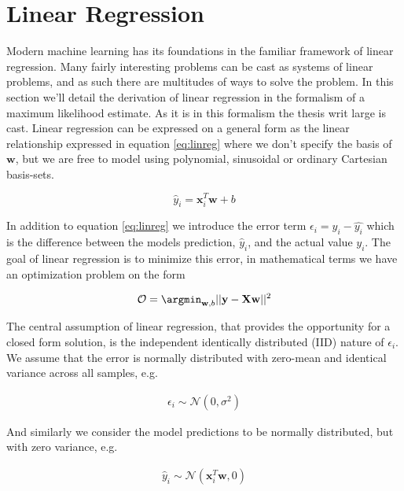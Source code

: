 
\section{Linear Regression}\label{sec:LinReg}

Modern machine learning has its foundations in the familiar framework of linear regression. Many fairly interesting problems can be cast as systems of linear problems, and as such there are multitudes of ways to solve the problem. In this section we'll detail the derivation of linear regression in the formalism of a maximum likelihood estimate. As it is in this formalism the thesis writ large is cast. Linear regression can be expressed on a general form as the linear relationship expressed in equation \ref{eq:linreg} where we don't specify the basis of $\mathbf{w}$, but we are free to model using polynomial, sinusoidal or ordinary Cartesian basis-sets.

\begin{equation}\label{eq:linreg}
\hat{y}_i = \mathbf{x}_i^T\mathbf{w} + b
\end{equation}

\noindent In addition to equation \ref{eq:linreg} we introduce the error term $\epsilon_i= y_i - \hat{y_i}$ which is the difference between the models prediction, $\hat{y}_i$, and the actual value $y_i$. The goal of linear regression is to minimize this error, in mathematical terms we have an optimization problem on the form

\begin{equation}
\mathcal{O} = \argmin _{\mathbf{w}, b} || \mathbf{y} - \mathbf{Xw} ||^2
\end{equation}

\noindent  The central assumption of linear regression, that provides the opportunity for a closed form solution, is the independent identically distributed (IID) nature of $\epsilon_i$. We assume that the error is normally distributed with zero-mean and identical variance across all samples, e.g. 

\begin{align}
\epsilon_i \sim \mathcal{N}(0, \sigma^2)
\end{align}

\noindent And similarly we consider the model predictions to be normally distributed, but with zero variance, e.g.

\begin{align}
\hat{y}_i \sim \mathcal{N}(\mathbf{x}_i^T\mathbf{w}, 0)
\end{align}

